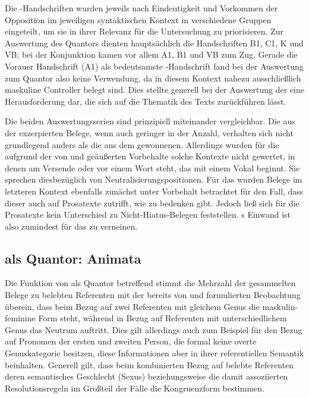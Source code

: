 Die \KC{}-Handschriften wurden jeweils nach Eindeutigkeit und Vorkommen
der Opposition im jeweiligen syntaktischen Kontext in verschiedene Gruppen
eingeteilt, um sie in ihrer Relevanz für die Untersuchung zu priorisieren. Zur
Auswertung des Quantors  dienten hauptsächlich die Handschriften
B1, C1, K und VB; bei der
Konjunktion  kamen vor allem A1, B1 und
VB zum Zug. Gerade die Vorauer Handschrift (A1) als
bedeutsamste \KC{}-Handschrift fand bei der Auswertung zum Quantor
 also keine Verwendung, da in diesem Kontext nahezu
ausschließlich maskuline Controller belegt sind. Dies stellte generell bei der
Auswertung der \KC{} eine Herausforderung dar, die sich auf die Thematik
des Texts zurückführen lässt.

Die beiden Auswertungsserien sind prinzipiell miteinander vergleichbar. Die aus
der \KC{} exzerpierten Belege, wenn auch geringer in der Anzahl, verhalten sich
nicht grundlegend anders als die aus dem \CAO{} gewonnenen. Allerdings wurden
für die \KC{} aufgrund der von \citet[89--90]{askedal1973} und
\citet[191]{gjelsten1980} geäußerten Vorbehalte solche Kontexte nicht gewertet,
in denen  am Versende oder vor einem Wort steht, das mit einem
Vokal beginnt. Sie sprechen diesbezüglich von Neutralisierungs\-positionen. Für
das \CAO{} wurden Belege im letzteren Kontext ebenfalls zunächst unter
Vorbehalt betrachtet für den Fall, dass dieser auch auf Prosatexte zutrifft,
wie \citet[92]{askedal1973} zu bedenken gibt. Jedoch ließ sich für die
Prosatexte kein Unterschied zu Nicht-\allowbreak{}Hiatus-\allowbreak{}Belegen
feststellen. \citeauthor{askedal1973}s Einwand ist also zumindest für das
\CAO{} zu verneinen.

\subsection{ als Quantor: Animata}

Die Funktion von  als Quantor betreffend stimmt die Mehrzahl der
gesammelten Belege zu belebten Referenten mit der bereits von
\citet[312]{grimm1890} und \citet[39--41]{behaghel1928} formulierten
Beobachtung überein, dass beim Bezug auf zwei Referenten mit gleichem Genus die
maskulin-feminine Form steht, während in Bezug auf Referenten mit
unterschiedlichem Genus das Neutrum auftritt. Dies gilt allerdings auch zum
Beispiel für den Bezug auf Pronomen der ersten und zweiten Person, die formal
keine overte Genuskategorie besitzen, diese Informationen aber in ihrer
referentiellen Semantik beinhalten. Generell gilt, dass beim kombinierten Bezug
auf belebte Referenten deren semantisches Geschlecht (Sexus) beziehungsweise
die damit assoziierten Resolutionsregeln im Großteil der Fälle die
Kongruenzform bestimmen.

